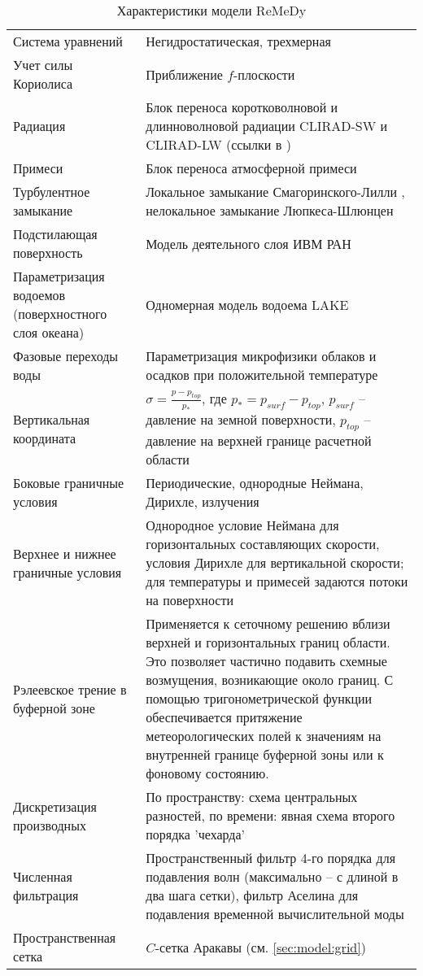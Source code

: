 \renewcommand{\arraystretch}{2}
\begin{table}
\centering
\caption{Характеристики модели ReMeDy}
\label{tab:model}
\small
\begin{tabu} to 
\toprule
Система уравнений & Негидростатическая, трехмерная \\
Учет силы Кориолиса & Приближение $f$-плоскости \\
Радиация & Блок переноса коротковолновой и длинноволновой радиации CLIRAD-SW и CLIRAD-LW (ссылки в \citep{StepanenkoMikushin2008})\\
Примеси & Блок переноса атмосферной примеси \citep{StepanenkoMikushin2008} \\
Турбулентное замыкание	& Локальное замыкание Смагоринского-Лилли \citep{Smagorinsky1958,Lilly1962}, нелокальное замыкание Люпкеса-Шлюнцен \citep{LupkesSchluenzen1996,NohEtAl2003} \\
Подстилающая поверхность & Модель деятельного слоя ИВМ РАН \citep{VolodinLykosov1998} \\
Параметризация водоемов (поверхностного слоя океана)	& Одномерная модель водоема LAKE \citep{StepanenkoEtAl2011} \\
Фазовые переходы воды & Параметризация микрофизики облаков и осадков при положительной температуре \citep{TeixeiraMiranda1997}\\
Вертикальная координата & $\sigma=\frac{p-p_{top}}{p_*}$, где $p_*=p_{surf}-p_{top}$, $p_{surf}$ -- давление на земной поверхности, $p_{top}$ -- давление на верхней границе расчетной области \\
Боковые граничные условия & Периодические, однородные Неймана, Дирихле, излучения \\
Верхнее и нижнее граничные условия & Однородное условие Неймана для горизонтальных составляющих скорости, условия Дирихле для вертикальной скорости; для температуры и примесей задаются потоки на поверхности \\
Рэлеевское трение в буферной зоне & Применяется к сеточному решению вблизи верхней и горизонтальных границ области. Это позволяет частично подавить схемные возмущения, возникающие около границ. С помощью тригонометрической функции обеспечивается притяжение метеорологических полей к значениям на внутренней границе буферной зоны или к фоновому состоянию. \\
Дискретизация производных & По пространству: схема центральных разностей, по времени: явная схема второго порядка 'чехарда' \\
Численная фильтрация & Пространственный фильтр 4-го порядка для подавления волн (максимально – с длиной в два шага сетки), фильтр Аселина для подавления временной вычислительной моды \\
Пространственная сетка & $C$-сетка Аракавы (см. \ref{sec:model:grid})\\
\bottomrule
\end{tabu}
\end{table}

